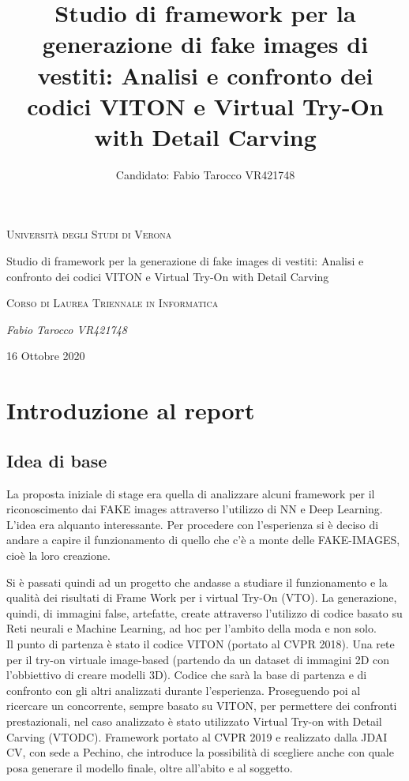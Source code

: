 \documentclass[final, 11pt]{article}
\title{Studio di framework per la generazione di fake images di vestiti: Analisi e confronto dei codici VITON e Virtual Try-On with Detail Carving}
\author{ Candidato: Fabio Tarocco VR421748}
\begin{document}
	\clearpage
	
\begin{titlepage}
	\centering
	\vspace*{\fill}
	{\scshape\LARGE Università degli Studi di Verona \par}
	\vspace{1.5cm}
	{\huge Studio di framework per la generazione di fake images di vestiti: Analisi e confronto dei codici VITON e Virtual Try-On with Detail Carving \par}
	\vspace{0.5cm}
	{\scshape  Corso di Laurea Triennale in Informatica \par}
	\vspace{1cm}
	{\Large\itshape Fabio Tarocco VR421748 \par}
	\vspace{1cm}
	\vspace{5cm}
	\vspace*{\fill}
	{\large 16 Ottobre 2020 \par}
\end{titlepage}
	\newpage
	\thispagestyle{plain} %
	\mbox{}
	\clearpage
	
	\tableofcontents
	\newpage
	\section{Introduzione al report}
	\subsection{Idea di base}
	La proposta iniziale di stage era quella di analizzare alcuni framework per il riconoscimento dai FAKE images attraverso l’utilizzo di NN e Deep Learning. L’idea era alquanto interessante.
	Per procedere con l’esperienza si è deciso di andare a capire il funzionamento di quello che c’è a monte delle FAKE-IMAGES, cioè la loro creazione.
	
	Si è passati quindi ad un progetto che andasse a studiare il funzionamento e la qualità dei risultati di Frame Work per i virtual Try-On (VTO). La generazione, quindi, di immagini false, artefatte, create attraverso l’utilizzo di codice basato su Reti neurali e Machine Learning, ad hoc per l’ambito della moda e non solo.\\
	Il punto di partenza è stato il codice VITON (portato al CVPR 2018). Una rete per il try-on virtuale image-based (partendo da un dataset di immagini 2D con l’obbiettivo di creare modelli 3D). Codice che sarà la base di partenza e di confronto con gli altri analizzati durante l’esperienza.
	Proseguendo poi al ricercare un concorrente, sempre basato su VITON, per permettere dei confronti prestazionali, nel caso analizzato è stato utilizzato Virtual Try-on with Detail Carving (VTODC). Framework portato al CVPR 2019 e realizzato dalla JDAI CV, con sede a Pechino, che introduce la possibilità di scegliere anche con quale posa generare il modello finale, oltre all’abito e al soggetto.
	
\end{document}
